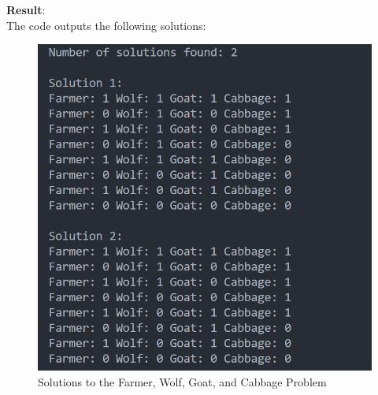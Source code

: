\documentclass[UTF8]{ctexart}
\begin{document}
\textbf{\large Result}:\\
The code outputs the following solutions:
\begin{figure}[htbp]
    \centering
    \includegraphics[width=0.45\linewidth]{farmerrow.png}
    \caption{Solutions to the Farmer, Wolf, Goat, and Cabbage Problem}
\end{figure}
\end{document}
